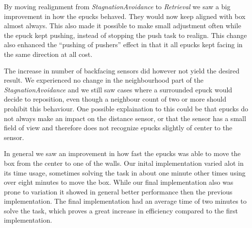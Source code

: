 \documentclass[12pt]{article}
\newcommand{\shiftline}[0]{\hfill\newline\noindent}
\begin{document}
		\shiftline By moving realignment from \textit{StagnationAvoidance} to \textit{Retrieval} we saw a big improvement in how the epucks behaved. 
		They would now keep aligned with box almost always. This also made it possible to make small adjustment often while the epuck kept pushing, 
		instead of stopping the push task to realign. This change also enhanced the "`pushing of pushers"' effect in that it all epucks kept facing in the same direction at all cost. 
		
		
		\shiftline The increase in number of backfacing sensors did however not yield the desired result.
		We experienced no change in the neighbourhood part of the \textit{StagnationAvoidance} and we still
		saw cases where a surrounded epuck would decide to reposition, even though a neighbour count of two or more should prohibit this behaviour. 
		One possible explaination to this could be that epucks do not always make an impact on the distance sensor, or that the sensor has a small
		field of view and therefore does not recognize epucks slightly of center to the sensor.
		
		\shiftline In general we saw an improvement in how fast the epucks was able to move the box from the center to one of the walls. 
		Our inital implementation varied alot in its time usage, sometimes solving the task in about one minute other times using over eight minutes to move the box.
		While our final implementation also was prone to variation it showed in general better performance then the previous implementation. 
		The final implementation had an average time of two minutes to solve the task, which proves a great increase in efficiency compared to the first implementation.
		
		\shiftline 
\end{document}
